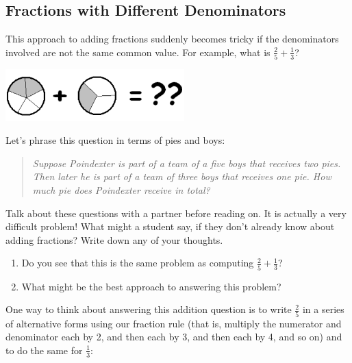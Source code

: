 \subsection{Fractions with Different Denominators}

This approach to adding fractions suddenly becomes tricky if the denominators
involved are not the same common value. For example, what is
$\frac 2 5 + \frac 1 3$?

   \begin{center}
\includegraphics[height = 2cm]{addingfrac1}
\end{center}


Let's phrase this question in terms of pies and boys:

\begin{quotation}
\emph{Suppose Poindexter is part of a team of a five boys that receives two pies.
Then later he is part of a team of three boys that receives one pie. How much pie does
Poindexter receive in total?}
\end{quotation}

\begin{thinkpair*}
Talk about these questions with a partner before reading on. It is actually a very difficult problem!  What might a student say, if they don't already know about adding fractions?  Write down any of your thoughts.
\begin{enumerate}
\item
Do you see that this is the same problem as computing $ \frac 2 5 + \frac 1 3$?
\item
What might be the best approach to answering this problem?
\end{enumerate}

\end{thinkpair*}



One way to think about answering this addition question is to write
$\frac 2 5$
in a series of
alternative forms using our fraction rule (that is, multiply the numerator and
denominator each by 2, and then each by 3, and then each by 4, and so on) and to do
the same for
$\frac 1 3$:

